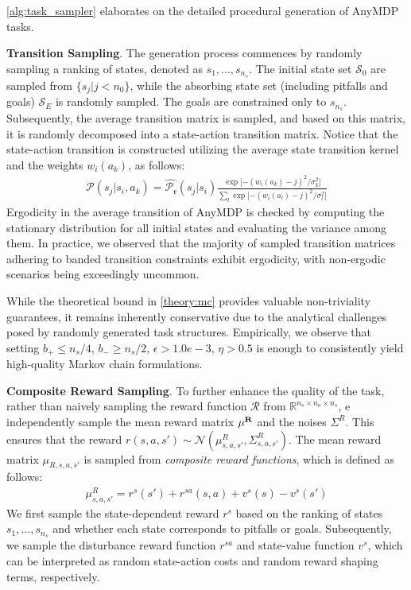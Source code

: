 \documentclass{article}
\begin{document}
\cref{alg:task_sampler} elaborates on the detailed procedural generation of AnyMDP tasks. 

\textbf{Transition Sampling}. The generation process commences by randomly sampling a ranking of states, denoted as $s_1, ..., s_{n_s}$. The initial state set $\mathcal{S}_0$ are sampled from $\{s_j| j<n_0\}$, while the absorbing state set (including pitfalls and goals) $\mathcal{S}_E$ is randomly sampled. The goals are constrained only to $s_{n_s}$.
Subsequently, the average transition matrix is sampled, and based on this matrix, it is randomly decomposed into a state-action transition matrix. Notice that the state-action transition is constructed utilizing the average state transition kernel and the weights $w_i(a_k)$, as follows:
\begin{align}
    \mathcal{P}(s_j|s_i, a_k) = \hat{\mathcal{P}_{\mathfrak{r}}}(s_j|s_i)\frac{\exp{[-(w_i(a_k)-j)^2 / \sigma_k^2}]}{\sum_l \exp{[-(w_i(a_l)-j)^2 / \sigma_l^2}]} \label{eq:sample_sa_trans}
\end{align}
Ergodicity in the average transition of AnyMDP is checked by computing the stationary distribution for all initial states and evaluating the variance among them. In practice, we observed that the majority of sampled transition matrices adhering to banded transition constraints exhibit ergodicity, with non-ergodic scenarios being exceedingly uncommon.

While the theoretical bound in \cref{theory:mc} provides valuable non-triviality guarantees, it remains inherently conservative due to the analytical challenges posed by randomly generated task structures. Empirically, we observe that setting $b_+ \le n_s/4$, $b_- \ge n_s/2$, $\epsilon>1.0e-3$, $\eta>0.5$ is enough to consistently yield high-quality Markov chain formulations.

\textbf{Composite Reward Sampling}. To further enhance the quality of the task, rather than naively sampling the reward function $\mathcal{R}$ from $\mathbb{R}^{n_s\times n_a \times n_s}$, e independently sample the mean reward matrix $\bf{\mu}^R$ and the noises $\Sigma^R$. This ensures that the reward $r(s,a,s') \sim \mathcal{N}(\mu^R_{s,a,s'}, \Sigma^R_{s,a,s'})$. The mean reward matrix $\mu_{R,s,a,s'}$ is sampled from \emph{composite reward functions}, which is defined as follows:
\begin{align}
    \mu^R_{s,a,s'} = r^s(s') + r^{sa}(s,a) + v^s(s)-v^s(s') \label{eq:composite_rewards}
\end{align}
We first sample the state-dependent reward $r^s$ based on the ranking of states $s_1, ..., s_{n_s}$ and whether each state corresponds to pitfalls or goals. Subsequently, we sample the disturbance reward function $r^{sa}$ and state-value function $v^s$, which can be interpreted as random state-action costs and random reward shaping terms, respectively.
\end{document}
